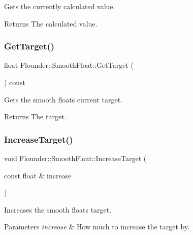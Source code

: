 Gets the currently calculated value. 

\begin{DoxyReturn}{Returns}
The calculated value. 
\end{DoxyReturn}
\mbox{\label{class_flounder_1_1_smooth_float_a263c1f2fd667e6536ca9d2f920e0e585}} 
\subsubsection{\texorpdfstring{Get\+Target()}{GetTarget()}}
{\footnotesize\ttfamily float Flounder\+::\+Smooth\+Float\+::\+Get\+Target (\begin{DoxyParamCaption}{ }\end{DoxyParamCaption}) const\hspace{0.3cm}{\ttfamily [inline]}}



Gets the smooth floats current target. 

\begin{DoxyReturn}{Returns}
The target. 
\end{DoxyReturn}
\mbox{\label{class_flounder_1_1_smooth_float_a55abfe2e8d7092e88e4f224deda12d36}} 
\subsubsection{\texorpdfstring{Increase\+Target()}{IncreaseTarget()}}
{\footnotesize\ttfamily void Flounder\+::\+Smooth\+Float\+::\+Increase\+Target (\begin{DoxyParamCaption}\item[{const float \&}]{increase }\end{DoxyParamCaption})\hspace{0.3cm}{\ttfamily [inline]}}



Increases the smooth floats target. 


\begin{DoxyParams}{Parameters}
{\em increase} & How much to increase the target by. \\
\hline
\end{DoxyParams}
\mbox{\label{class_flounder_1_1_smooth_float_aa523d70b695e7e6d4713622b2cc3eacc}} 
